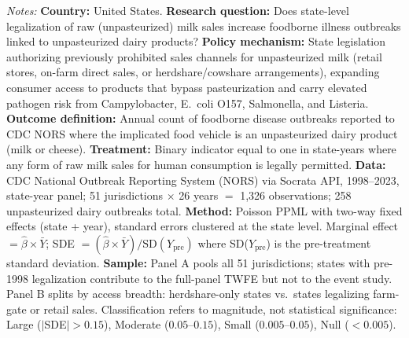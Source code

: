 \begin{table}[t]
\begin{tablenotes}[flushleft]
\item \textit{Notes:} \textbf{Country:} United States. \textbf{Research question:} Does state-level legalization of raw (unpasteurized) milk sales increase foodborne illness outbreaks linked to unpasteurized dairy products? \textbf{Policy mechanism:} State legislation authorizing previously prohibited sales channels for unpasteurized milk (retail stores, on-farm direct sales, or herdshare/cowshare arrangements), expanding consumer access to products that bypass pasteurization and carry elevated pathogen risk from Campylobacter, E.\ coli O157, Salmonella, and Listeria. \textbf{Outcome definition:} Annual count of foodborne disease outbreaks reported to CDC NORS where the implicated food vehicle is an unpasteurized dairy product (milk or cheese). \textbf{Treatment:} Binary indicator equal to one in state-years where any form of raw milk sales for human consumption is legally permitted. \textbf{Data:} CDC National Outbreak Reporting System (NORS) via Socrata API, 1998--2023, state-year panel; 51 jurisdictions $\times$ 26 years $=$ 1,326 observations; 258 unpasteurized dairy outbreaks total. \textbf{Method:} Poisson PPML with two-way fixed effects (state + year), standard errors clustered at the state level. Marginal effect $= \hat{\beta} \times \bar{Y}$; SDE $= (\hat{\beta} \times \bar{Y}) / \text{SD}(Y_{\text{pre}})$ where SD($Y_{\text{pre}}$) is the pre-treatment standard deviation. \textbf{Sample:} Panel A pools all 51 jurisdictions; states with pre-1998 legalization contribute to the full-panel TWFE but not to the event study. Panel B splits by access breadth: herdshare-only states vs.\ states legalizing farm-gate or retail sales. Classification refers to magnitude, not statistical significance: Large ($|$SDE$| > 0.15$), Moderate ($0.05$--$0.15$), Small ($0.005$--$0.05$), Null ($< 0.005$).
\end{tablenotes}
\end{table}
